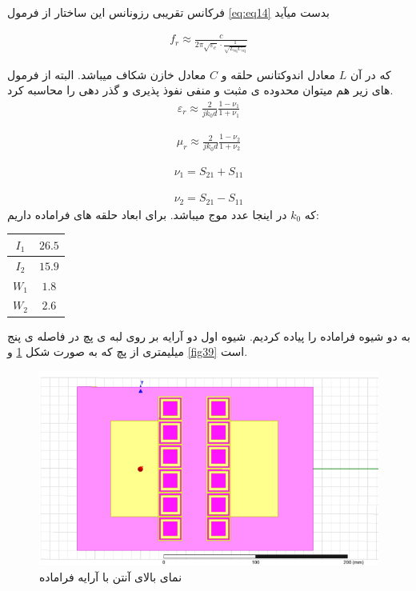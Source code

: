 فرکانس تقریبی رزونانس این ساختار از فرمول 
\eqref{eq:eq14}
 بدست میآید

\begin{align}
	\label{eq:eq14}
	f_r \approx \frac{c}{2\pi\sqrt{\varepsilon_{e}} \cdot \frac{1}{\sqrt{L_{\text{eq}}C_{\text{eq}}}}}
\end{align}

که در آن
$L$
 معادل اندوکتانس حلقه و
 $ C $
 معادل خازن شکاف میباشد. البته از فرمول های زیر هم میتوان محدوده ی مثبت و منفی نفوذ پذیری و گذر دهی را محاسبه کرد.
\begin{align}
	\label{eq:eq15}
	\varepsilon_r \approx \frac{2}{jk_0d}\frac{1-\nu_1}{1+\nu_1}
\end{align}

\begin{align}
	\label{eq:eq15}
	\mu_r \approx \frac{2}{jk_0d}\frac{1-\nu_2}{1+\nu_2}
\end{align}

\begin{align}
	\label{eq:eq15}
	\nu_1=S_{21}+S_{11}
\end{align}


\begin{align}
	\label{eq:eq15}
	\nu_2=S_{21}-S_{11}
\end{align}
که
$ k_0$
 در اینجا عدد موج میباشد.
برای ابعاد حلقه های فراماده داریم:
 \begin{center}
	\begin{tabular}{|c|c|}
		\hline
		$I_1$ & $26.5$ \\
		\hline
		$I_2$ & $15.9$ \\
		\hline
		$W_1$ & $1.8$ \\
		\hline
		$W_2$ & $2.6$ \\
		\hline
	\end{tabular}
\end{center}

به دو شیوه فراماده را پیاده کردیم. شیوه اول دو آرایه بر روی لبه ی پچ در فاصله ی پنج میلیمتری از پچ که به صورت شکل
\ref{fig38}
و
\ref{fig39}
است.
\begin{figure}
	\centering
	\includegraphics[scale=0.5]{Images/fig38.png}
	\caption{نمای بالای آنتن با آرایه فراماده}
	\label{fig38}
\end{figure}

